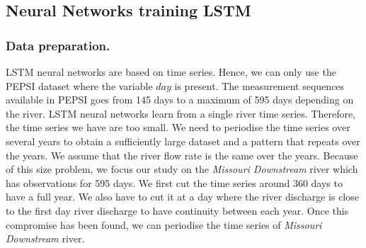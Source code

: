 \subsection{Neural Networks training LSTM}

\subsubsection{Data preparation.}

LSTM neural networks are based on time series. Hence, we can only use the PEPSI dataset where the variable $day$ is present. The measurement sequences available in PEPSI goes from 145 days to a maximum of 595 days depending on the river. LSTM neural networks learn from a single river time series. Therefore, the time series we have are too small. We need to periodise the time series over several years to obtain a sufficiently large dataset and a pattern that repeats over the years. We assume that the river flow rate is the same over the years. Because of this size problem, we focus our study on the \textit{Missouri Downstream} river which has observations for 595 days. We first cut the time series around 360 days to have a full year. We also have to cut it at a day where the river discharge is close to the first day river discharge to have continuity between each year. Once this compromise has been found, we can periodise the time series of \textit{Missouri Downstream} river. 

